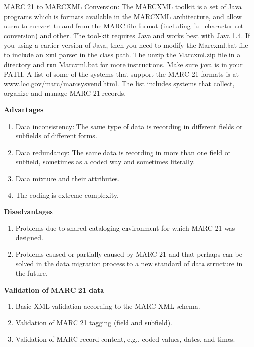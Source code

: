 \begin{enumerate}
	MARC 21 to MARCXML Conversion: The MARCXML toolkit is a set of Java programs which is formats available in the MARCXML architecture, 
	and allow users to convert to and from the MARC file format (including full character set conversion) and other. 
	The tool-kit requires Java and works best with Java 1.4. 
	If you using a earlier version of Java, 
	then you need to modify the Marcxml.bat file to include an xml parser in the class path. 
	The unzip the Marcxml.zip file in a directory and run Marcxml.bat for more instructions. 
	Make sure java is in your PATH.
	A list of some of the systems that support the MARC 21 formats is at www.loc.gov/marc/marcsysvend.html. 
	The list includes systems that collect, organize and manage MARC 21 records.
	
	
	
	{\bf Advantages}
	\begin{enumerate}
		\item Data inconsistency: The same type of data is recording in different fields or subfields of different forms.
		\item Data redundancy: The same data is recording in more than one field or subfield, sometimes as a coded way and sometimes literally.	
		\item Data mixture and their attributes.
		\item The coding is extreme complexity.
	\end{enumerate}	
	{\bf Disadvantages}
	\begin{enumerate}
		\item Problems due to shared cataloging environment for which MARC 21 was designed.
		\item Problems caused or partially caused by MARC 21 and that perhaps can be solved in the data migration process to a new standard of data structure in the future.
	\end{enumerate}
	
	{\bf Validation of MARC 21 data}
	\begin{enumerate}
		\item Basic XML validation according to the MARC XML schema.
		\item Validation of MARC 21 tagging (field and subfield).
		\item Validation of MARC record content, e.g., coded values, dates, and times.
	\end{enumerate}
	

\end{enumerate}
